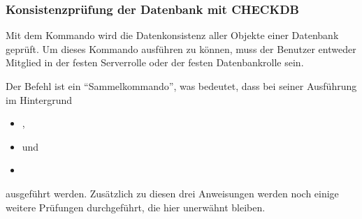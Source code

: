         \subsubsection{Konsistenzprüfung der Datenbank mit CHECKDB}
          Mit dem Kommando  wird die Datenkonsistenz aller
          Objekte einer Datenbank geprüft. Um dieses Kommando ausführen zu können,
          muss der Benutzer entweder Mitglied in der festen Serverrolle
           oder der festen Datenbankrolle
           sein.
          
          Der Befehl  ist ein \enquote{Sammelkommando}, was
          bedeutet, dass bei seiner Ausführung im Hintergrund 
          \begin{itemize}
            \item {},
            \item {} und
            \item {}
          \end{itemize}
          ausgeführt werden. Zusätzlich zu diesen drei Anweisungen werden noch
          einige weitere Prüfungen durchgeführt, die hier unerwähnt bleiben.
          
